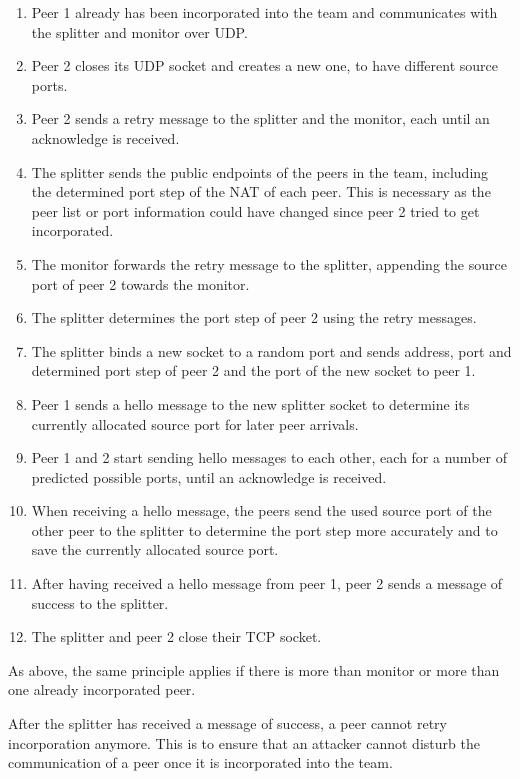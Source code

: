\documentclass{article}
\begin{document}
\begin{enumerate}

\item Peer 1 already has been incorporated into the team and communicates
  with the splitter and monitor over UDP.

\item Peer 2 closes its UDP socket and creates a new one, to have
  different source ports.

\item Peer 2 sends a retry message to the splitter and the monitor, each
  until an acknowledge is received.

\item The splitter sends the public endpoints of the peers in the team,
  including the determined port step of the NAT of each peer. This is
  necessary as the peer list or port information could have changed
  since peer 2 tried to get incorporated.

\item The monitor forwards the retry message to the splitter, appending
  the source port of peer 2 towards the monitor.

\item The splitter determines the port step of peer 2 using the retry
  messages.

\item The splitter binds a new socket to a random port and sends address,
  port and determined port step of peer 2 and the port of the new
  socket to peer 1.

\item Peer 1 sends a hello message to the new splitter socket to determine
  its currently allocated source port for later peer arrivals.

\item Peer 1 and 2 start sending hello messages to each other, each for a
  number of predicted possible ports, until an acknowledge is
  received.

\item When receiving a hello message, the peers send the used source port
  of the other peer to the splitter to determine the port step more
  accurately and to save the currently allocated source port.

\item After having received a hello message from peer 1, peer 2 sends a
  message of success to the splitter.

\item The splitter and peer 2 close their TCP socket.

\end{enumerate}

As above, the same principle applies if there is more than monitor or
more than one already incorporated peer.

After the splitter has received a message of success, a peer cannot
retry incorporation anymore. This is to ensure that an attacker cannot
disturb the communication of a peer once it is incorporated into the
team.
\end{document}
